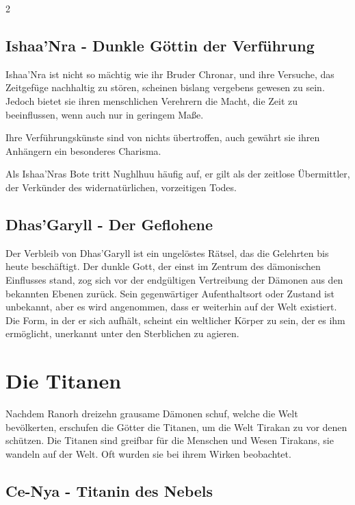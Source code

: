 \begin{multicols}{2}
{\subsection{Ishaa'Nra - Dunkle Göttin der Verführung}\label{subsec:ishaa'nra-dunkle-gottin-der-verfuhrung}

Ishaa'Nra ist nicht so mächtig wie ihr Bruder Chronar, und ihre Versuche, das Zeitgefüge nachhaltig zu stören, scheinen bislang vergebens gewesen zu sein.
Jedoch bietet sie ihren menschlichen Verehrern die Macht, die Zeit zu beeinflussen, wenn auch nur in geringem Maße.

Ihre Verführungskünste sind von nichts übertroffen, auch gewährt sie ihren Anhängern ein besonderes Charisma.

Als Ishaa'Nras Bote tritt Nughlhuu häufig auf, er gilt als der zeitlose Übermittler, der Verkünder des widernatürlichen, vorzeitigen Todes.

\subsection{Dhas'Garyll - Der Geflohene}\label{subsec:dhasgaryll-der-geflohene}

Der Verbleib von Dhas'Garyll ist ein ungelöstes Rätsel, das die Gelehrten bis heute beschäftigt.
Der dunkle Gott, der einst im Zentrum des dämonischen Einflusses stand, zog sich vor der endgültigen Vertreibung der Dämonen aus den bekannten Ebenen zurück.
Sein gegenwärtiger Aufenthaltsort oder Zustand ist unbekannt, aber es wird angenommen, dass er weiterhin auf der Welt existiert.
Die Form, in der er sich aufhält, scheint ein weltlicher Körper zu sein, der es ihm ermöglicht, unerkannt unter den Sterblichen zu agieren.


\section{Die Titanen}\label{sec:die-titanen}

Nachdem Ranorh dreizehn grausame Dämonen schuf, welche die Welt bevölkerten, erschufen die Götter die Titanen, um die Welt Tirakan zu vor denen schützen.
Die Titanen sind greifbar für die Menschen und Wesen Tirakans, sie wandeln auf der Welt.
Oft wurden sie bei ihrem Wirken beobachtet.

\subsection{Ce-Nya - Titanin des Nebels}\label{subsec:ce-nya-titanin-des-nebels}

}
\end{multicols}
